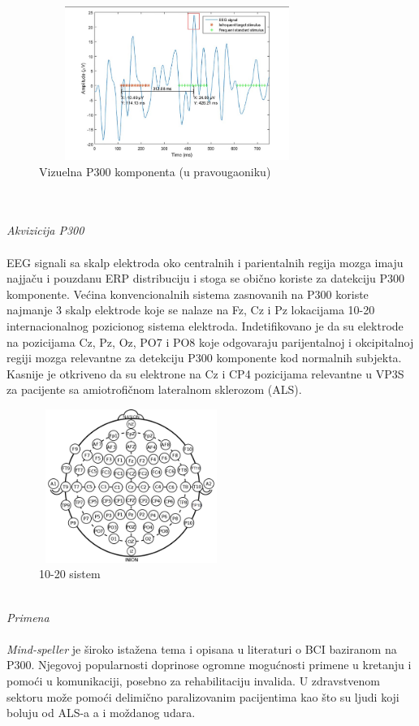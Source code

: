 \documentclass[conference]{IEEEtran}
\begin{document}
\begin{figure}[htp]
\centerline{\includegraphics[width=9cm, height=5cm]{P300 signal.png}}
\caption{Vizuelna P300 komponenta (u pravougaoniku)}
\label{Slika}
\end{figure}
\\
\\
\textit{Akvizicija P300}\\
\\
EEG signali sa skalp elektroda oko centralnih i parientalnih regija mozga imaju najjaču i pouzdanu ERP distribuciju i stoga se obično koriste za datekciju P300 komponente. Većina konvencionalnih sistema zasnovanih na P300 koriste najmanje 3 skalp elektrode koje se nalaze na Fz, Cz  i Pz lokacijama 10-20 internacionalnog pozicionog sistema elektroda. Indetifikovano je da su elektrode na pozicijama Cz, Pz, Oz, PO7 i PO8 koje odgovaraju parijentalnoj i okcipitalnoj regiji mozga relevantne za detekciju P300 komponente kod normalnih subjekta. Kasnije je otkriveno da su elektrone na Cz i CP4 pozicijama relevantne u VP3S za pacijente sa amiotrofičnom lateralnom sklerozom (ALS).
\begin{figure}[htp]
\centerline{\includegraphics[width=6cm, height=5cm]{International_10-20_system_for_EEG-MCN.png}}
\caption{10-20 sistem}
\label{Slika}
\end{figure}
\\
\textit{Primena}
\\\\
\textit{Mind-speller} je široko istažena tema i opisana u literaturi o BCI baziranom na P300. Njegovoj popularnosti doprinose ogromne mogućnosti primene u kretanju i pomoći u komunikaciji, posebno za rehabilitaciju invalida. U zdravstvenom sektoru može pomoći delimično paralizovanim pacijentima kao što su ljudi koji boluju od ALS-a a i moždanog udara.
\end{document}
